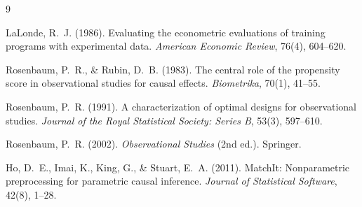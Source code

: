 \documentclass[12pt, a4paper]{article}
\begin{document}
\newpage

\begin{thebibliography}{9}

LaLonde, R.~J. (1986).
\newblock Evaluating the econometric evaluations of training programs with
  experimental data.
\newblock \textit{American Economic Review}, 76(4), 604--620.

Rosenbaum, P.~R., \& Rubin, D.~B. (1983).
\newblock The central role of the propensity score in observational studies for
  causal effects.
\newblock \textit{Biometrika}, 70(1), 41--55.

Rosenbaum, P.~R. (1991).
\newblock A characterization of optimal designs for observational studies.
\newblock \textit{Journal of the Royal Statistical Society: Series B}, 53(3),
  597--610.

Rosenbaum, P.~R. (2002).
\newblock \textit{Observational Studies} (2nd ed.).
\newblock Springer.

Ho, D.~E., Imai, K., King, G., \& Stuart, E.~A. (2011).
\newblock MatchIt: Nonparametric preprocessing for parametric causal inference.
\newblock \textit{Journal of Statistical Software}, 42(8), 1--28.

\end{thebibliography}
\end{document}
